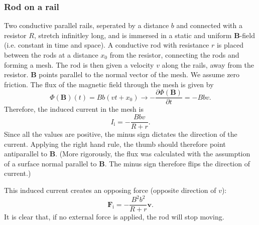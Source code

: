 \documentclass[a4paper, 12pt]{article}
\renewcommand{\vec}[1]{\mathbf{#1}}
\newcommand{\B}{\ensuremath{\vec{B}}}
\begin{document}
        \subsubsection{Rod on a rail}
            Two conductive parallel rails, seperated by a distance $b$ and connected with a resistor $R$, stretch infinitley long, 
            and is immersed in a static and uniform \B-field (i.e. constant in time and space). 
            A conductive rod with resistance $r$ is placed between the rods at a distance $x_0$ from the resistor, 
            connecting the rods and forming a mesh. The rod is then given a velocity $v$ along the rails, away from the resistor.
            \B{} points parallel to the normal vector of the mesh. We assume zero friction. 
            The flux of the magnetic field through the mesh is given by
            \begin{equation}
                \Phi(\B)(t) = Bb(vt+x_0) \rightarrow -\frac{\partial \Phi(\B)}{\partial t} = -Bbv.
            \end{equation}
            Therefore, the induced current in the mesh is
            \begin{equation}
                I_\text{i} = -\frac{Bbv}{R+r}.
            \end{equation}
            Since all the values are positive, the minus sign dictates the direction of the current. Applying the right hand rule,
            the thumb should therefore point antiparallel to \B. 
            (More rigorously, the flux was calculated with the assumption of a surface normal parallel to \B. 
            The minus sign therefore flips the direction of current.)

            This induced current creates an opposing force (opposite direction of $v$): 
            \begin{equation}
                \vec{F}_\text{i} = -\frac{B^2b^2}{R+r}\vec{v}.
            \end{equation}
            It is clear that, if no external force is applied, the rod will stop moving.
\end{document}

